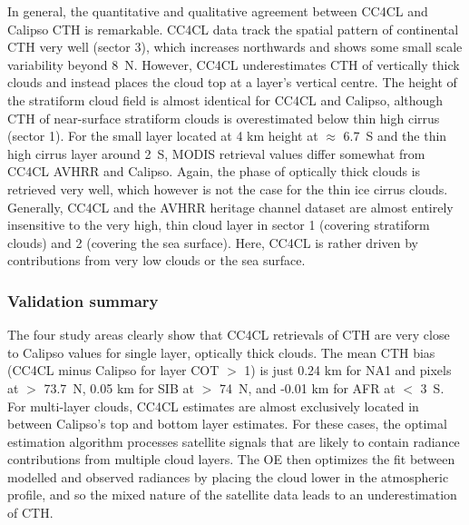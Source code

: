 In general, the quantitative and qualitative agreement between CC4CL and Calipso CTH is remarkable. CC4CL data track the spatial pattern of continental CTH very well (sector 3), which increases northwards and shows some small scale variability beyond 8\textdegree\ N. However, CC4CL underestimates CTH of vertically thick clouds and instead places the cloud top at a layer's vertical centre. The height of the stratiform cloud field is almost identical for CC4CL and Calipso, although CTH of near-surface stratiform clouds is overestimated below thin high cirrus (sector 1). For the small layer located at 4 km height at $\approx$ 6.7\textdegree\ S and the thin high cirrus layer around 2\textdegree\ S, MODIS retrieval values differ somewhat from CC4CL AVHRR and Calipso. Again, the phase of optically thick clouds is retrieved very well, which however is not the case for the thin ice cirrus clouds. Generally, CC4CL and the AVHRR heritage channel dataset are almost entirely insensitive to the very high, thin cloud layer in sector 1 (covering stratiform clouds) and 2 (covering the sea surface). Here, CC4CL is rather driven by contributions from very low clouds or the sea surface. 

\subsubsection{Validation summary}

The four study areas clearly show that CC4CL retrievals of CTH are very close to Calipso values for single layer, optically thick clouds. The mean CTH bias (CC4CL minus Calipso for layer COT $>$ 1) is just 0.24 km for NA1 and pixels at $>$ 73.7\textdegree\ N, 0.05 km for SIB at $>$ 74\textdegree\ N, and -0.01 km for AFR at $<$ 3\textdegree\ S. For multi-layer clouds, CC4CL estimates are almost exclusively located in between Calipso's top and bottom layer estimates. For these cases, the optimal estimation algorithm processes satellite signals that are likely to contain radiance contributions from multiple cloud layers. The OE then optimizes the fit between modelled and observed radiances by placing the cloud lower in the atmospheric profile, and so the mixed nature of the satellite data leads to an underestimation of CTH. %

